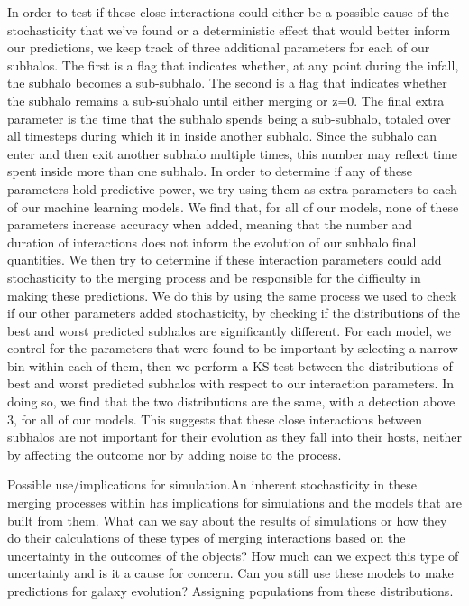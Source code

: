 \documentclass[fleqn,usenatbib]{mnras}
\newcommand\edits[1]{{\color{red}#1}}
\begin{document}
In order to test if these close interactions could either be a possible cause of the stochasticity that we've found or a deterministic effect that would better inform our predictions, we keep track of three additional parameters for each of our subhalos. The first is a flag that indicates whether, at any point during the infall, the subhalo becomes a sub-subhalo. The second is a flag that indicates whether the subhalo remains a sub-subhalo until either merging or z=0. The final extra parameter is the time that the subhalo spends being a sub-subhalo, totaled over all timesteps during which it in inside another subhalo. Since the subhalo can enter and then exit another subhalo multiple times, this number may reflect time spent inside more than one subhalo. In order to determine if any of these parameters hold predictive power, we try using them as extra parameters to each of our machine learning models. We find that, for all of our models, none of these parameters increase accuracy when added, meaning that the number and duration of interactions does not inform the evolution of our subhalo final quantities. We then try to determine if these interaction parameters could add stochasticity to the merging process and be responsible for the difficulty in making these predictions. We do this by using the same process we used to check if our other parameters added stochasticity, by checking if the distributions of the best and worst predicted subhalos are significantly different. For each model, we control for the parameters that were found to be important by selecting a narrow bin within each of them, then we perform a KS test between the distributions of best and worst predicted subhalos with respect to our interaction parameters. In doing so, we find that the two distributions are the same, with a detection above 3\textsigma, for all of our models. This suggests that these close interactions between subhalos are not important for their evolution as they fall into their hosts, neither by affecting the outcome nor by adding noise to the process.

\edits{Possible use/implications for simulation.}An inherent stochasticity in these merging processes within has implications for simulations and the models that are built from them.  \edits{What can we say about the results of simulations or how they do their calculations of these types of merging interactions based on the uncertainty in the outcomes of the objects? How much can we expect this type of uncertainty and is it a cause for concern.
 Can you still use these models to make predictions for galaxy evolution? Assigning populations from these distributions.}
\end{document}

